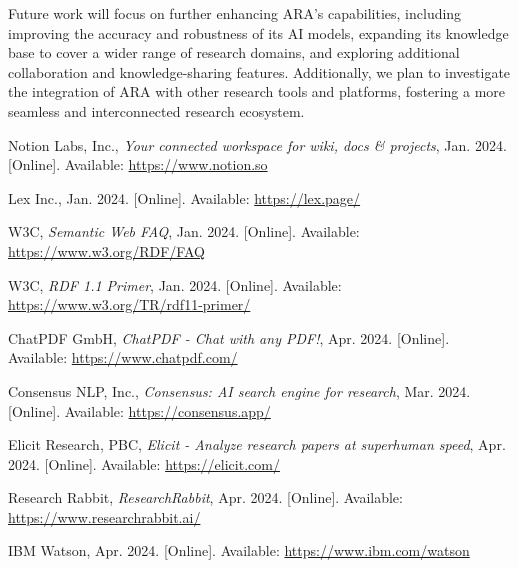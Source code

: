 \documentclass[a4paper,conference]{IEEEtran}
\begin{document}
Future work will focus on further enhancing ARA's capabilities, including improving the accuracy and robustness of its AI models, expanding its knowledge base to cover a wider range of research domains, and exploring additional collaboration and knowledge-sharing features. Additionally, we plan to investigate the integration of ARA with other research tools and platforms, fostering a more seamless and interconnected research ecosystem.

\begin{thebibliography}{00}
 Notion Labs, Inc., \emph{Your connected workspace for wiki, docs \& projects}, Jan. 2024. [Online]. Available: \url{https://www.notion.so}

 Lex Inc., Jan. 2024. [Online]. Available: \url{https://lex.page/}

 W3C, \emph{Semantic Web FAQ}, Jan. 2024. [Online]. Available: \url{https://www.w3.org/RDF/FAQ}

 W3C, \emph{RDF 1.1 Primer}, Jan. 2024. [Online]. Available: \url{https://www.w3.org/TR/rdf11-primer/}

 ChatPDF GmbH, \emph{ChatPDF - Chat with any PDF!}, Apr. 2024. [Online]. Available: \url{https://www.chatpdf.com/}

 Consensus NLP, Inc., \emph{Consensus: AI search engine for research}, Mar. 2024. [Online]. Available: \url{https://consensus.app/}

 Elicit Research, PBC, \emph{Elicit - Analyze research papers at superhuman speed}, Apr. 2024. [Online]. Available: \url{https://elicit.com/}

 Research Rabbit, \emph{ResearchRabbit}, Apr. 2024. [Online]. Available: \url{https://www.researchrabbit.ai/}

 IBM Watson, Apr. 2024. [Online]. Available: \url{https://www.ibm.com/watson}
\end{thebibliography}
\end{document}
